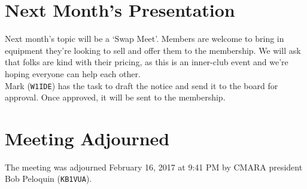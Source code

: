 \documentclass[10pt,letterpaper]{article}
\begin{document}
\section{Next Month's Presentation}
Next month's topic will be a `Swap Meet'. Members are welcome to bring in equipment they're looking to sell and offer them to the membership. We will ask that folks are kind with their pricing, as this is an inner-club event and we're hoping everyone can help each other.\\

\noindent
Mark (\texttt{W1IDE}) has the task to draft the notice and send it to the board for approval. Once approved, it will be sent to the membership.

\section{Meeting Adjourned}
The meeting was adjourned February 16, 2017 at 9:41 PM by CMARA president Bob Peloquin (\texttt{KB1VUA}).
\end{document}
